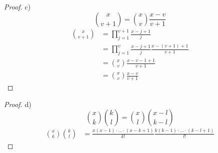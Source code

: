 \documentclass{../problemset}
\begin{document}
\begin{proof}
	c)
	\begin{displaymath}
		\binom{x}{v+1} = \binom{x}{v}\frac{x-v}{v+1}
	\end{displaymath}
	\begin{align}
		\binom{x}{v+1} & = \prod_{j=1}^{v+1}\frac{x-j+1}{j}                    \\
		               & = \prod_{j=1}^{v}\frac{x-j+1}{j}\frac{x-(v+1)+1}{v+1} \\
		               & = \binom{x}{v}\frac{x-v-1+1}{v+1}                     \\
		               & = \binom{x}{v}\frac{x-v}{v+1}
	\end{align}
\end{proof}
\begin{proof}
	d)
	\begin{displaymath}
		\binom{x}{k}\binom{k}{l} = \binom{x}{l}\binom{x-l}{k-l}
	\end{displaymath}
	\begin{align}
		\binom{x}{k}\binom{k}{l} & = \frac{x(x-1)\cdot\ldots\cdot(x-k+1)}{k!}\frac{k(k-1)\cdot\ldots\cdot(k-l+1)}{l!}
	\end{align}
\end{proof}

\pagebreak
\end{document}
